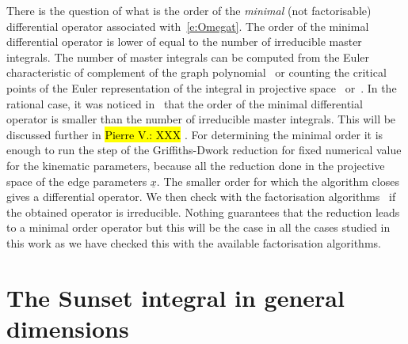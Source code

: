 \documentclass[a4paper,12pt]{article}
\numberwithin{equation}{section}
\numberwithin{figure}{subsection}
\theoremstyle{plain}
\theoremstyle{plain}
\theoremstyle{definition}
\theoremstyle{plain}
\theoremstyle{remark}
\theoremstyle{plain}
\newcommand{\pvnote}[1]{\sethlcolor{bubblegum} \protect\hl{Pierre V.: #1} \sethlcolor{yellow}}
\begin{document}
There is the question of what is the order of the \emph{minimal} (not
factorisable) differential operator associated with~\eqref{e:Omegat}.
The order of the minimal differential operator is lower of equal to
the number of irreducible master integrals. The number of master
integrals  can be computed from the Euler
characteristic of complement of the graph polynomial~\cite{Bitoun:2017nre} or counting the
critical points of the Euler representation of the integral in
projective
space~\cite{Lee:2013hzt,Cacciatori:2021nli,Agostini:2022cgv} or~\cite{Mastrolia:2018uzb,Frellesvig:2019uqt}.   In the rational case, it was noticed
in~\cite{Bloch:2013tra,Bloch:2016izu,Bloch:2014qca,Lairez:2022zkj} that the order of the minimal differential operator is
smaller than the number of irreducible master integrals. This will be
discussed further in\pvnote{XXX}. For
determining the minimal order it is enough to run the step of the
Griffiths-Dwork reduction for fixed numerical value for the kinematic
parameters, because all the reduction done in the projective space of
the edge parameters $\underline x$. The smaller order for which the
algorithm closes gives a differential operator. We then check with the
factorisation algorithms~\cite{chyzak2022symbolic,goyer2021sage} if
the obtained operator is irreducible. Nothing guarantees that the reduction leads to
a minimal order operator but this will be  the case in all the cases
studied in this work as we have checked this with the available
factorisation algorithms.


\section{The Sunset integral in general dimensions}
\end{document}
